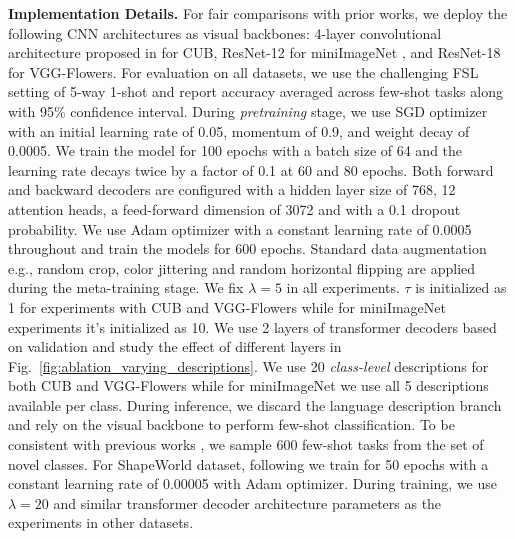 \documentclass{bmvc2k}
\begin{document}
\noindent \textbf{Implementation Details.}
For fair comparisons with prior works,
we deploy the following CNN architectures as visual backbones: 4-layer convolutional architecture proposed in \cite{snell2017prototypical} for CUB, ResNet-12 for miniImageNet \cite{RFS, chen2020new, metaoptnet}, and ResNet-18 \cite{Su2020When} for VGG-Flowers. For evaluation on all datasets, we use the challenging FSL setting of 5-way 1-shot  and report accuracy averaged across few-shot tasks along with 95\% confidence interval. During \textit{pretraining} stage, we use SGD optimizer with an initial learning rate of 0.05, momentum of 0.9, and weight decay of 0.0005. We train the model for 100 epochs with a batch size of 64 and the learning rate decays twice by a factor of 0.1 at 60 and 80 epochs. 
Both forward and backward decoders are configured with a hidden layer size of 768, 12 attention heads, a feed-forward dimension of 3072 and with a 0.1 dropout probability.
We use Adam optimizer with a constant learning rate of 0.0005 throughout and train the models for 600 epochs. Standard data augmentation e.g., random crop, color jittering and random horizontal flipping are applied during the meta-training stage. We fix $\lambda = 5$ in all experiments. $\tau$ is initialized as 1 for experiments with CUB and VGG-Flowers while for miniImageNet experiments it's initialized as 10. We use 2 layers of transformer decoders based on validation and study the effect of different layers in Fig.~\ref{fig:ablation_varying_descriptions}. We use 20 \textit{class-level} descriptions for both CUB and VGG-Flowers while for miniImageNet we use all 5 descriptions available per class. During inference, we discard the language description branch and rely on the visual backbone to perform few-shot classification. To be consistent with previous works \cite{Chen2019ACL, Su2020When}, we sample 600 few-shot tasks from the set of novel classes.
For ShapeWorld dataset, following \cite{mu2020shaping} we train for 50 epochs with a constant learning rate of 0.00005 with Adam optimizer. During training, we use $\lambda = 20$ and similar transformer decoder architecture parameters as the experiments in other datasets.  
\vspace{-0.4cm}
\end{document}

